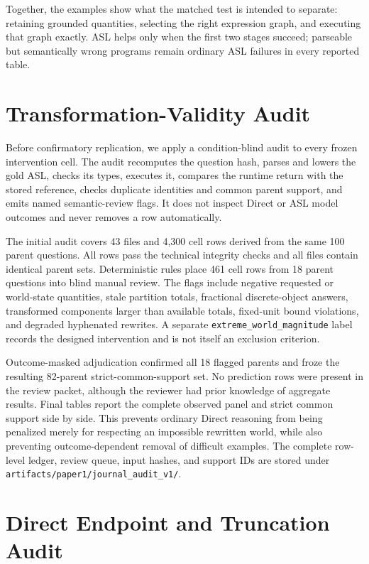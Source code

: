 \documentclass[11pt]{article}
\begin{document}
Together, the examples show what the matched test is intended to separate:
retaining grounded quantities, selecting the right expression graph, and
executing that graph exactly.  ASL helps only when the first two stages succeed;
parseable but semantically wrong programs remain ordinary ASL failures in every
reported table.

\section{Transformation-Validity Audit}
\label{app:transformation-audit}

Before confirmatory replication, we apply a condition-blind audit to every
frozen intervention cell.  The audit recomputes the question hash, parses and
lowers the gold ASL, checks its types, executes it, compares the runtime return
with the stored reference, checks duplicate identities and common parent
support, and emits named semantic-review flags.  It does not inspect Direct or
ASL model outcomes and never removes a row automatically.

The initial audit covers 43 files and 4,300 cell rows derived from the same 100
parent questions.  All rows pass the technical integrity checks and all files
contain identical parent sets.  Deterministic rules place 461 cell rows from 18
parent questions into blind manual review.  The flags include negative requested
or world-state quantities, stale partition totals, fractional discrete-object
answers, transformed components larger than available totals, fixed-unit bound
violations, and degraded hyphenated rewrites.  A separate
\texttt{extreme\_world\_magnitude} label records the designed intervention and
is not itself an exclusion criterion.

Outcome-masked adjudication confirmed all 18 flagged parents and froze the
resulting 82-parent strict-common-support set.  No prediction rows were present
in the review packet, although the reviewer had prior knowledge of aggregate
results.  Final tables report the complete observed panel and strict common
support side by side.  This prevents ordinary Direct reasoning
from being penalized merely for respecting an impossible rewritten world, while
also preventing outcome-dependent removal of difficult examples.  The complete
row-level ledger, review queue, input hashes, and support IDs are stored under
\texttt{artifacts/paper1/journal\_audit\_v1/}.

\section{Direct Endpoint and Truncation Audit}
\label{app:direct-scorer-v2}
\end{document}
